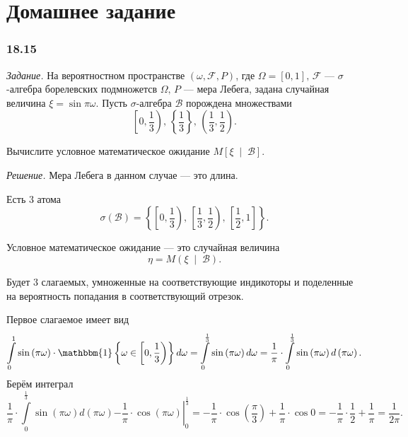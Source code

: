 \section*{Домашнее задание}

\subsubsection*{18.15}

\textit{Задание.}
На вероятностном пространстве $ \left( \omega, \mathcal{F}, P \right) $,
где $ \Omega = \left[ 0, 1 \right], \, \mathcal{F}$ ---
$ \sigma $-алгебра борелевских подмножетсв $ \Omega, \, P$ --- мера Лебега,
задана случайная величина $ \xi = \sin \pi \omega $.
Пусть $ \sigma $-алгебра $ \mathcal{B}$ порождена множествами
$$ \left[0, \frac{1}{3} \right), \,
  \left\{ \frac{1}{3} \right\}, \,
  \left( \frac{1}{3}, \frac{1}{2} \right).$$

Вычислите условное математическое ожидание $M \left[ \xi \; \middle| \; \mathcal{B} \right] $.

\textit{Решение.} Мера Лебега в данном случае --- это длина.

Есть 3 атома
$$ \sigma \left( \mathcal{B} \right) =
  \left\{
    \left[ 0, \frac{1}{3} \right), \,
    \left[ \frac{1}{3}, \frac{1}{2} \right), \,
    \left[ \frac{1}{2}, 1 \right]
  \right\}.$$

Условное математическое ожидание ---
это случайная величина
$$ \eta =
  M \left( \xi \; \middle| \; \mathcal{B} \right).$$

Будет 3 слагаемых,
умноженные на соответствующие
индикоторы и поделенные на вероятность попадания в соответствующий отрезок.

Первое слагаемое имеет вид
$$ \int \limits_0^1
  \sin \left( \pi \omega \right) \cdot
  \mathbbm{1} \left\{ \omega \in \left[ 0, \frac{1}{3} \right) \right\} d \omega =
  \int \limits_0^{ \frac{1}{3}} \sin \left( \pi \omega \right) d \omega =
  \frac{1}{ \pi } \cdot
  \int \limits_0^{ \frac{1}{3}} \sin \left( \pi \omega \right) d \left( \pi \omega \right).$$
Берём интеграл
$$ \frac{1}{ \pi } \cdot
  \int \limits_0^{ \frac{1}{3}} \sin \left( \pi \omega \right) d \left( \pi \omega \right)
  \left. - \frac{1}{ \pi } \cdot \cos \left( \pi \omega \right) \right|_0^{ \frac{1}{3}} =
  - \frac{1}{ \pi } \cdot \cos \left( \frac{ \pi }{3} \right) + \frac{1}{ \pi } \cdot \cos 0=
  - \frac{1}{ \pi } \cdot \frac{1}{2} + \frac{1}{ \pi } =
  \frac{1}{2 \pi }.$$

